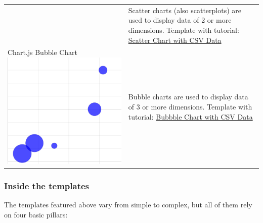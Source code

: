 \documentclass[
  english,
]{book}
\begin{document}
\begin{longtable}[]{@{}ll@{}}
\begin{minipage}[t]{0.47\columnwidth}
\end{minipage} & \begin{minipage}[t]{0.47\columnwidth}\raggedright
Scatter charts (also scatterplots) are used to display data of 2 or more dimensions. Template with tutorial: \href{line-chart-with-csv-data}{Scatter Chart with CSV Data}\strut
\end{minipage}\tabularnewline
\begin{minipage}[t]{0.47\columnwidth}\raggedright
Chart.js Bubble Chart \includegraphics{images/12-chartjs/chartjs-bubble.png}\strut
\end{minipage} & \begin{minipage}[t]{0.47\columnwidth}\raggedright
Bubble charts are used to display data of 3 or more dimensions. Template with tutorial: \href{bubble-chart-with-csv-data}{Bubbble Chart with CSV Data}\strut
\end{minipage}\tabularnewline
\bottomrule
\end{longtable}

\hypertarget{inside-the-templates}{%
\subsubsection*{Inside the templates}\label{inside-the-templates}}

The templates featured above vary from simple to complex, but all of them rely on four basic pillars:
\end{document}
